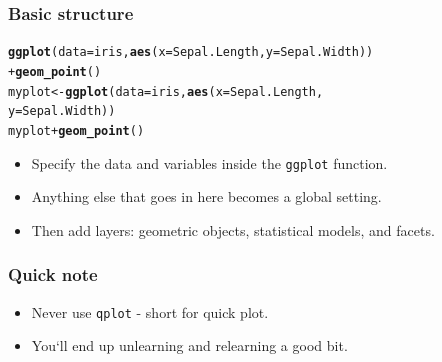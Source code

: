 \documentclass{beamer}\usepackage[]{graphicx}\usepackage[]{color}
\makeatletter
\newcommand{\hlopt}[1]{\textcolor[rgb]{0,0,0}{#1}}%
\newcommand{\hlstd}[1]{\textcolor[rgb]{0.345,0.345,0.345}{#1}}%
\newcommand{\hlkwb}[1]{\textcolor[rgb]{0.69,0.353,0.396}{#1}}%
\newcommand{\hlkwc}[1]{\textcolor[rgb]{0.333,0.667,0.333}{#1}}%
\newcommand{\hlkwd}[1]{\textcolor[rgb]{0.737,0.353,0.396}{\textbf{#1}}}%
\newenvironment{kframe}{%
 \def\at@end@of@kframe{}%
 \ifinner\ifhmode%
  \def\at@end@of@kframe{\end{minipage}}%
  \begin{minipage}{\columnwidth}%
 \fi\fi%
 \def\FrameCommand##1{\hskip\@totalleftmargin \hskip-\fboxsep
 \colorbox{shadecolor}{##1}\hskip-\fboxsep
     \hskip-\linewidth \hskip-\@totalleftmargin \hskip\columnwidth}%
 \MakeFramed {\advance\hsize-\width
   \@totalleftmargin\z@ \linewidth\hsize
   \@setminipage}}%
 {\par\unskip\endMakeFramed%
 \at@end@of@kframe}
\newenvironment{knitrout}{}{} %
\makeatother
\begin{document}
\begin{frame}[fragile]
\frametitle{Basic structure}
\begin{knitrout}\footnotesize
{}\color{fgcolor}\begin{kframe}
\begin{alltt}
\hlkwd{ggplot}\hlstd{(}\hlkwc{data} \hlstd{= iris,} \hlkwd{aes}\hlstd{(}\hlkwc{x} \hlstd{= Sepal.Length,} \hlkwc{y} \hlstd{= Sepal.Width))}
    \hlopt{+} \hlkwd{geom_point}\hlstd{()}
\hlstd{myplot} \hlkwb{<-} \hlkwd{ggplot}\hlstd{(}\hlkwc{data} \hlstd{= iris,} \hlkwd{aes}\hlstd{(}\hlkwc{x} \hlstd{= Sepal.Length,}
                                \hlkwc{y} \hlstd{= Sepal.Width))}
\hlstd{myplot} \hlopt{+} \hlkwd{geom_point}\hlstd{()}
\end{alltt}
\end{kframe}
\end{knitrout}
\begin{itemize}
\item Specify the data and variables inside the \texttt{ggplot} function.
\item Anything else that goes in here becomes a global setting.
\item Then add layers: geometric objects, statistical models, and facets.
\end{itemize}
\end{frame}


\begin{frame}[fragile]
\frametitle{Quick note}
\begin{itemize}
\item Never use \texttt{qplot} - short for quick plot.
\item You`ll end up unlearning and relearning a good bit.
\end{itemize}

\end{frame}

\end{document}
